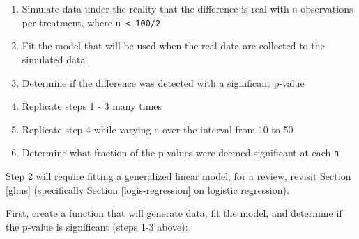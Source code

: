 \documentclass[]{book}
\providecommand{\tightlist}{%
  \setlength{\itemsep}{0pt}\setlength{\parskip}{0pt}}
\begin{document}
\begin{enumerate}
\def\labelenumi{\arabic{enumi}.}
\tightlist
\item
  Simulate data under the reality that the difference is real with \texttt{n} observations per treatment, where \texttt{n\ \textless{}\ 100/2}
\item
  Fit the model that will be used when the real data are collected to the simulated data
\item
  Determine if the difference was detected with a significant p-value
\item
  Replicate steps 1 - 3 many times
\item
  Replicate step 4 while varying \texttt{n} over the interval from 10 to 50
\item
  Determine what fraction of the p-values were deemed significant at each \texttt{n}
\end{enumerate}

Step 2 will require fitting a generalized linear model; for a review, revisit Section \ref{glms} (specifically Section \ref{logis-regression} on logistic regression).

First, create a function that will generate data, fit the model, and determine if the p-value is significant (steps 1-3 above):
\end{document}
